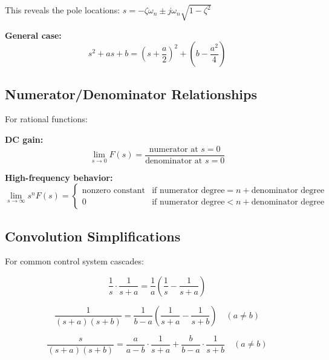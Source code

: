 \noindent This reveals the pole locations: $s = -\zeta\omega_n \pm j\omega_n\sqrt{1-\zeta^2}$

\textbf{General case:}
\begin{equation}
    s^2 + as + b = \left(s + \frac{a}{2}\right)^2 + \left(b - \frac{a^2}{4}\right)
\end{equation}

\subsection{Numerator/Denominator Relationships}
\label{subsec:numerator_denom}

For rational functions:

\textbf{DC gain:}
\begin{equation}
    \lim_{s \to 0} F(s) = \frac{\text{numerator at } s=0}{\text{denominator at } s=0}
\end{equation}

\textbf{High-frequency behavior:}
\begin{equation}
    \lim_{s \to \infty} s^n F(s) = \begin{cases}
        \text{nonzero constant} & \text{if numerator degree} = n + \text{denominator degree} \\
        0 & \text{if numerator degree} < n + \text{denominator degree}
    \end{cases}
\end{equation}

\subsection{Convolution Simplifications}
\label{subsec:convolution}

For common control system cascades:

\begin{equation}
    \frac{1}{s} \cdot \frac{1}{s+a} = \frac{1}{a}\left(\frac{1}{s} - \frac{1}{s+a}\right)
\end{equation}

\begin{equation}
    \frac{1}{(s+a)(s+b)} = \frac{1}{b-a}\left(\frac{1}{s+a} - \frac{1}{s+b}\right) \quad (a \neq b)
\end{equation}

\begin{equation}
    \frac{s}{(s+a)(s+b)} = \frac{a}{a-b} \cdot \frac{1}{s+a} + \frac{b}{b-a} \cdot \frac{1}{s+b} \quad (a \neq b)
\end{equation}

